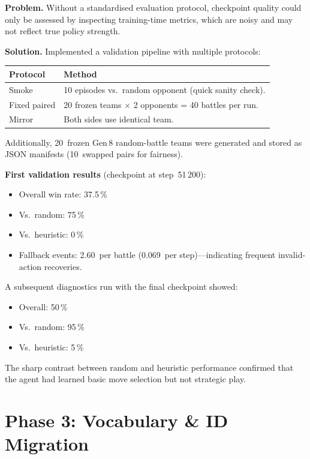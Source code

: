 \textbf{Problem.} Without a standardised evaluation protocol, checkpoint
quality could only be assessed by inspecting training-time metrics, which are
noisy and may not reflect true policy strength.

\textbf{Solution.} Implemented a validation pipeline with multiple protocols:

\begin{center}
\small
\begin{tabularx}{\textwidth}{l X}
  \toprule
  \textbf{Protocol} & \textbf{Method} \\
  \midrule
  Smoke        & 10 episodes vs.\ random opponent (quick sanity check). \\
  Fixed paired & 20 frozen teams $\times$ 2 opponents = 40 battles per run. \\
  Mirror       & Both sides use identical team. \\
  \bottomrule
\end{tabularx}
\end{center}

Additionally, 20~frozen Gen\,8 random-battle teams were generated and stored
as JSON manifests (10~swapped pairs for fairness).

\textbf{First validation results} (checkpoint at step~51\,200):
\begin{itemize}
  \item Overall win rate: 37.5\,\%
  \item Vs.\ random: 75\,\%
  \item Vs.\ heuristic: 0\,\%
  \item Fallback events: 2.60~per battle (0.069~per step)---indicating frequent
        invalid-action recoveries.
\end{itemize}

A subsequent diagnostics run with the final checkpoint showed:
\begin{itemize}
  \item Overall: 50\,\%
  \item Vs.\ random: 95\,\%
  \item Vs.\ heuristic: 5\,\%
\end{itemize}

The sharp contrast between random and heuristic performance confirmed that the
agent had learned basic move selection but not strategic play.

\section{Phase 3: Vocabulary \& ID Migration}

